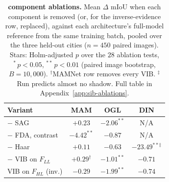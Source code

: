 \begin{table}[t]
\centering
\small
\begin{minipage}[c]{0.45\textwidth}
\caption{
\textbf{\sib{} component ablations.} Mean $\Delta$ mIoU when each component is removed (or, for the inverse-evidence row, replaced), against each architecture's full-model reference from the same training batch, pooled over the three held-out cities ($n = 450$ paired images). Stars: Holm-adjusted $p$ over the $28$ ablation tests, $^{*}\,p<0.05$, $^{**}\,p<0.01$ (paired image bootstrap, $B = 10{,}000$). $^{\dagger}$MAMNet row removes every VIB. $^{\ddagger}$Run predicts almost no shadow. Full table in Appendix~\ref{app:sib-ablations}.
}
\label{tab:sib-ablations}
\end{minipage}\hfill
\begin{minipage}[c]{0.52\textwidth}
\centering
\setlength{\tabcolsep}{4pt}
\begin{tabular}{l|ccc}
\toprule
\textbf{Variant} & \textbf{MAM} & \textbf{OGL} & \textbf{DIN} \\
\midrule
$-$ SAG                      & $+0.23$ & $-2.06^{**}$ & N/A \\
$-$ FDA, contrast            & $-4.42^{**}$ & $-0.87$ & N/A \\
$-$ Haar                     & $+0.11$ & $-0.63$ & $-23.49^{**\ddagger}$ \\
$-$ VIB on $F_{LL}$          & $+0.29^{\dagger}$ & $-1.01^{**}$ & $-0.71$ \\
VIB on $F_{HL}$ (inv.)       & $-0.29$ & $-1.99^{**}$ & $-0.74$ \\
\bottomrule
\end{tabular}
\end{minipage}
\end{table}